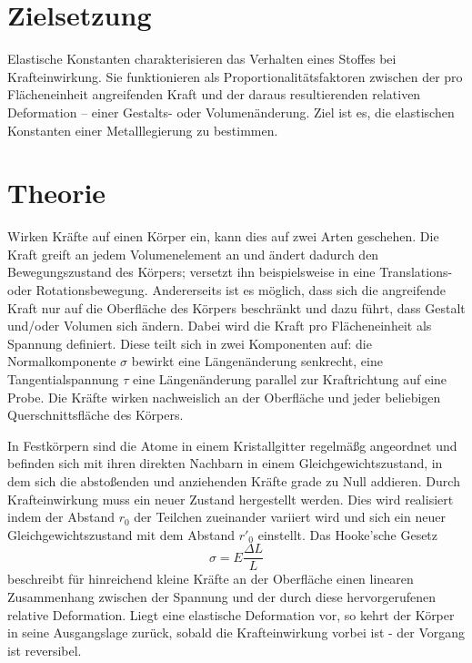 \section{Zielsetzung}
Elastische Konstanten charakterisieren das Verhalten eines Stoffes bei Krafteinwirkung.
 Sie funktionieren als Proportionalitätsfaktoren zwischen der pro Flächeneinheit angreifenden Kraft und der daraus resultierenden relativen Deformation -- einer Gestalts- oder Volumenänderung. 
Ziel ist es, die elastischen Konstanten einer Metalllegierung zu bestimmen.
\section{Theorie}
\label{sec:Theorie}
Wirken Kräfte auf einen Körper ein, kann dies auf zwei Arten geschehen. Die Kraft greift an jedem Volumenelement an und ändert dadurch den Bewegungszustand des Körpers; versetzt ihn beispielsweise in eine Translations- oder Rotationsbewegung. 
Andererseits ist es möglich, dass sich die angreifende Kraft nur auf die Oberfläche des Körpers beschränkt und dazu führt, dass Gestalt und/oder Volumen sich ändern. 
Dabei wird die Kraft pro Flächeneinheit als Spannung definiert. 
Diese teilt sich in zwei Komponenten auf: die Normalkomponente $\sigma$ bewirkt eine Längenänderung senkrecht, eine Tangentialspannung $\tau$ eine Längenänderung parallel zur Kraftrichtung auf eine Probe. 
Die Kräfte wirken nachweislich an der Oberfläche und jeder beliebigen Querschnittsfläche des Körpers. 

In Festkörpern sind die Atome in einem Kristallgitter regelmäßg angeordnet und befinden sich mit ihren direkten Nachbarn in einem Gleichgewichtszustand, in dem sich die abstoßenden und anziehenden Kräfte grade zu Null addieren. 
Durch Krafteinwirkung muss ein neuer Zustand hergestellt werden. 
Dies wird realisiert indem der Abstand $r_0$ der Teilchen zueinander variiert wird und sich ein neuer Gleichgewichtszustand mit dem Abstand $r'_0$ einstellt.
Das Hooke'sche Gesetz
\begin{equation}
\sigma=E\frac{\Delta{L}}{L}
\label{eq:hooke}
\end{equation}
beschreibt für hinreichend kleine Kräfte an der Oberfläche einen linearen Zusammenhang zwischen der Spannung und der durch diese hervorgerufenen relative Deformation.
Liegt eine elastische Deformation vor, so kehrt der Körper in seine Ausgangslage zurück, sobald die Krafteinwirkung vorbei ist - der Vorgang ist reversibel. 




